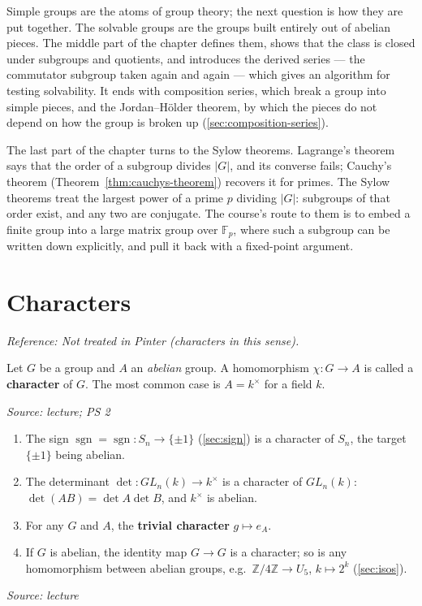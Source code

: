\documentclass[11pt]{report}
\newcommand{\sgn}{\operatorname{sgn}}
\newcommand{\srcline}[1]{\par\hfill{\footnotesize\textit{Source: #1}}}
\begin{document}
Simple groups are the atoms of group theory; the next question is how they are put together. The solvable groups are the groups built entirely out of abelian pieces. The middle part of the chapter defines them, shows that the class is closed under subgroups and quotients, and introduces the derived series --- the commutator subgroup taken again and again --- which gives an algorithm for testing solvability. It ends with composition series, which break a group into simple pieces, and the Jordan--H\"older theorem, by which the pieces do not depend on how the group is broken up (\ref{sec:composition-series}).

The last part of the chapter turns to the Sylow theorems. Lagrange's theorem says that the order of a subgroup divides $|G|$, and its converse fails; Cauchy's theorem (Theorem~\ref{thm:cauchys-theorem}) recovers it for primes. The Sylow theorems treat the largest power of a prime $p$ dividing $|G|$: subgroups of that order exist, and any two are conjugate. The course's route to them is to embed a finite group into a large matrix group over $\mathbb{F}_p$, where such a subgroup can be written down explicitly, and pull it back with a fixed-point argument.

\section{Characters}\label{sec:characters}

\textit{Reference: Not treated in Pinter (characters in this sense).}

\begin{defbox}[{Character}]\label{def:character}
Let $G$ be a group and $A$ an \emph{abelian} group. A homomorphism $\chi: G \to A$ is called a \textbf{character} of $G$. The most common case is $A = k^\times$ for a field $k$.
\srcline{lecture; PS 2}
\end{defbox}

\begin{exbox}[{Characters}]\label{ex:characters}
\begin{enumerate}[nosep]
    \item The sign $\sgn = \sgn: S_n \to \{\pm 1\}$ (\ref{sec:sign}) is a character of $S_n$, the target $\{\pm 1\}$ being abelian.
    \item The determinant $\det: GL_n(k) \to k^\times$ is a character of $GL_n(k)$: $\det(AB) = \det A \det B$, and $k^\times$ is abelian.
    \item For any $G$ and $A$, the \textbf{trivial character} $g \mapsto e_A$.
    \item If $G$ is abelian, the identity map $G \to G$ is a character; so is any homomorphism between abelian groups, e.g.\ $\mathbb{Z}/4\mathbb{Z} \to U_5$, $k \mapsto 2^k$ (\ref{sec:isos}).
\end{enumerate}
\srcline{lecture}
\end{exbox}
\end{document}
